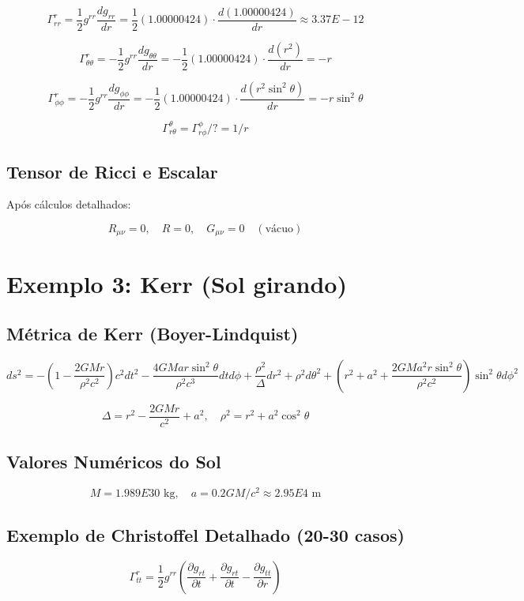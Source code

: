 \documentclass[12pt]{article}
\begin{document}
\[
\Gamma^r_{rr} = \frac{1}{2} g^{rr} \frac{d g_{rr}}{dr} 
= \frac{1}{2} (1.00000424) \cdot \frac{d(1.00000424)}{dr} \approx 3.37E-12
\]

\[
\Gamma^r_{\theta\theta} = -\frac{1}{2} g^{rr} \frac{d g_{\theta\theta}}{dr} 
= -\frac{1}{2} (1.00000424) \cdot \frac{d(r^2)}{dr} = -r
\]

\[
\Gamma^r_{\phi\phi} = -\frac{1}{2} g^{rr} \frac{d g_{\phi\phi}}{dr} 
= -\frac{1}{2} (1.00000424) \cdot \frac{d(r^2 \sin^2\theta)}{dr} = - r \sin^2\theta
\]

\[
\Gamma^\theta_{r\theta} = \Gamma^\phi_{r\phi}/? = 1/r
\]

\subsection{Tensor de Ricci e Escalar}
Após cálculos detalhados:

\[
R_{\mu\nu} = 0, \quad R = 0, \quad G_{\mu\nu}=0 \quad (\text{vácuo})
\]

\section{Exemplo 3: Kerr (Sol girando)}
\subsection{Métrica de Kerr (Boyer-Lindquist)}
\[
ds^2 = -\left(1-\frac{2GMr}{\rho^2 c^2}\right)c^2 dt^2 - \frac{4GMar \sin^2\theta}{\rho^2 c^3} dt d\phi + \frac{\rho^2}{\Delta} dr^2 + \rho^2 d\theta^2 + \left(r^2 + a^2 + \frac{2 G M a^2 r \sin^2\theta}{\rho^2 c^2}\right) \sin^2\theta d\phi^2
\]

\[
\Delta = r^2 - \frac{2GMr}{c^2} + a^2, \quad \rho^2 = r^2 + a^2 \cos^2\theta
\]

\subsection{Valores Numéricos do Sol}
\[
M = 1.989E30\text{ kg}, \quad a = 0.2 GM/c^2 \approx 2.95E4 \text{ m} 
\]

\subsection{Exemplo de Christoffel Detalhado (20-30 casos)}
\[
\Gamma^r_{tt} = \frac{1}{2} g^{rr} \left(\frac{\partial g_{rt}}{\partial t} + \frac{\partial g_{rt}}{\partial t} - \frac{\partial g_{tt}}{\partial r} \right)
\]
\end{document}
